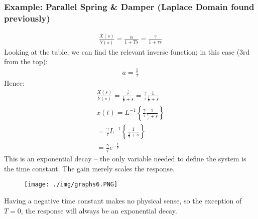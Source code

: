 \subsubsection*{Example: Parallel Spring \& Damper (Laplace Domain found previously)}
\begin{gather}
  \frac{X(s)}{Y(s)} = \frac{\alpha}{1+Ts} = \frac{\gamma}{1+\tau s}
\end{gather}
Looking at the table, we can find the relevant inverse function; in this case (3rd from the top):
\begin{gather}
  a = \frac{1}{\tau}
\end{gather}
Hence:
\begin{gather}
  \frac{X(s)}{Y(s)} = \frac{\frac{\gamma}{\tau}}{\frac{1}{\tau}+s} = \frac{\gamma}{\tau}\frac{1}{\frac{1}{\tau}+s} \\
  x(t) = L^{-1}\left\{\frac{\gamma}{\tau}\frac{1}{\frac{1}{\tau}+s}\right\} \\
  = \frac{\gamma}{\tau}L^{-1}\left\{\frac{1}{\frac{1}{\tau}+s}\right\} \\
  = \frac{\gamma}{\tau}e^{-\frac{t}{\tau}}
\end{gather}
This is an exponential decay – the only variable needed to define the system is the time constant. The gain merely scales the response.
\begin{figure}[H]
  \centering
  \texttt{[image: ./img/graphs6.PNG]}
\end{figure}
Having a negative time constant makes no physical sense, so the exception of $T=0$, the response will always be an exponential decay.
